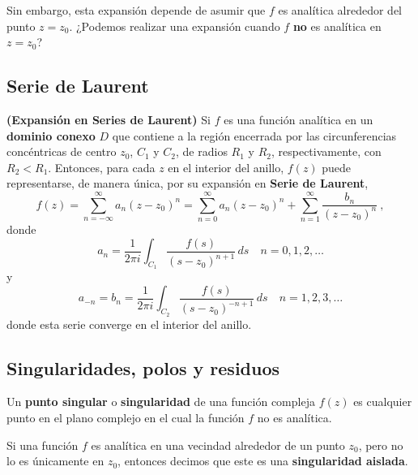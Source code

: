 Sin embargo, esta expansión depende de asumir que $f$ es analítica alrededor del punto $z=z_0$. ¿Podemos realizar una expansión cuando $f$ \textbf{no} es analítica en $z=z_0$?

\subsection{Serie de Laurent}

\begin{teorema}{\textbf{(Expansión en Series de Laurent)}} 
    Si $f$ es una función analítica en un \textbf{dominio conexo} $D$ que contiene a la región encerrada por las circunferencias concéntricas de centro $z_0$, $C_1$ y $C_2$, de radios $R_1$ y $R_2$, respectivamente, con $R_2 < R_1$. Entonces, para cada $z$ en el interior del anillo, $f(z)$ puede representarse, de manera única, por su expansión en \textbf{Serie de Laurent},  
    \begin{equation}
        f(z) = \sum_{n=-\infty}^\infty a_n (z-z_0)^n = \sum_{n=0}^\infty a_n (z-z_0)^n + \sum_{n=1}^\infty \frac{b_n}{(z-z_0)^n} \ , 
    \end{equation}
    donde 
    \begin{equation}
        a_{n} = \frac{1}{2\pi i} \int_{C_1} \frac{f(s)}{(s-z_0)^{n+1}} \, ds \quad n = 0, 1, 2, \dots
    \end{equation}
    y 
    \begin{equation}
        a_{-n} = b_n = \frac{1}{2\pi i} \int_{C_2} \frac{f(s)}{(s-z_0)^{-n+1}} \, ds \quad n = 1, 2, 3, \dots
    \end{equation}
    donde esta serie converge en el interior del anillo.
\end{teorema}

\subsection{Singularidades, polos y residuos}

\begin{defi}
    Un \textbf{punto singular} o \textbf{singularidad} de una función compleja $f(z)$ es cualquier punto en el plano complejo en el cual la función $f$ no es analítica.
\end{defi}

\begin{defi}
    Si una función $f$ es analítica en una vecindad alrededor de un punto $z_0$, pero no lo es únicamente en $z_0$, entonces decimos que este es una \textbf{singularidad aislada}. 
\end{defi}

